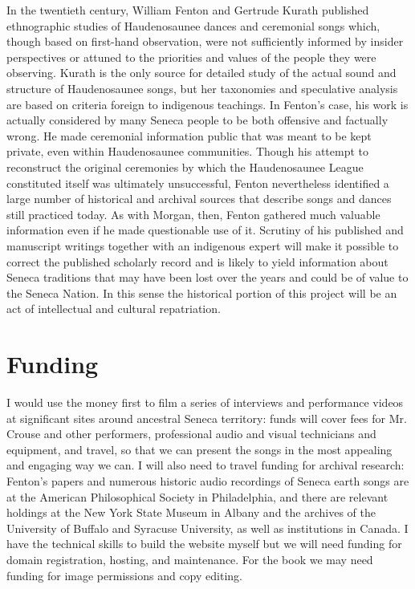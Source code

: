 \documentclass[12pt]{article}
\begin{document}
In the twentieth century, William Fenton and Gertrude Kurath published
ethnographic studies of Haudenosaunee dances and ceremonial songs which,
though based on first-hand observation, were not sufficiently informed by
insider perspectives or attuned to the priorities and values of the people
they were observing.%
\Autocites{Fenton:GreatLaw}{Kurath:IroquoisMusic}
Kurath is the only source for detailed study of the actual sound and structure
of Haudenosaunee songs, but her taxonomies and speculative analysis are based
on criteria foreign to indigenous teachings.
In Fenton's case, his work is actually considered by many Seneca people to be
both offensive and factually wrong.
He made ceremonial information public that was meant to be kept private, even
within Haudenosaunee communities.
Though his attempt to reconstruct the original ceremonies by which the
Haudenosaunee League constituted itself was ultimately unsuccessful, Fenton
nevertheless identified a large number of historical and archival sources that
describe songs and dances still practiced today.
As with Morgan, then, Fenton gathered much valuable information even if he
made questionable use of it.
Scrutiny of his published and manuscript writings together with an indigenous
expert will make it possible to correct the published scholarly record and is
likely to yield information about Seneca traditions that may have been lost
over the years and could be of value to the Seneca Nation.
In this sense the historical portion of this project will be an act of
intellectual and cultural repatriation.

\section{Funding}

I would use the money first to film a series of interviews and performance
videos at significant sites around ancestral Seneca territory: funds will
cover fees for Mr. Crouse and other performers, professional audio and visual
technicians and equipment, and travel, so that we can present the songs in the
most appealing and engaging way we can.
I will also need to travel funding for archival research: Fenton's papers
and numerous historic audio recordings of Seneca earth songs are at the
American Philosophical Society in Philadelphia, and there are relevant
holdings at the New York State Museum in Albany and the archives of the
University of Buffalo and Syracuse University, as well as institutions in
Canada.
I have the technical skills to build the website myself but we will need
funding for domain registration, hosting, and maintenance.
For the book we may need funding for image permissions and copy editing.
\end{document}
